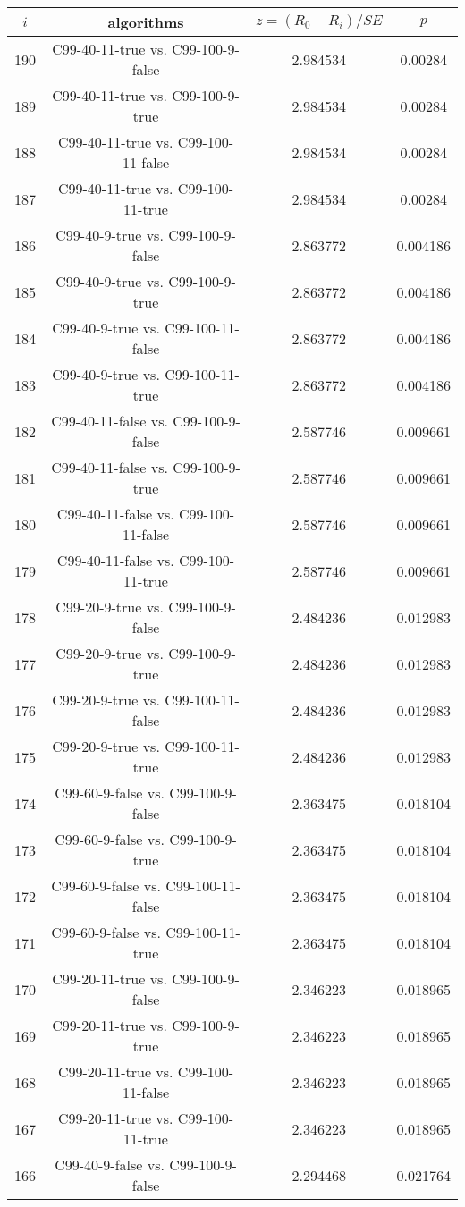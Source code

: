 \documentclass[a4paper,10pt]{article}
\begin{document}
\begin{landscape}
\begin{table}[!htp]
\centering\scriptsize
\begin{tabular}{cccc}
$i$&algorithms&$z=(R_0 - R_i)/SE$&$p$\\
\hline190&C99-40-11-true vs. C99-100-9-false&2.984534&0.00284\\
189&C99-40-11-true vs. C99-100-9-true&2.984534&0.00284\\
188&C99-40-11-true vs. C99-100-11-false&2.984534&0.00284\\
187&C99-40-11-true vs. C99-100-11-true&2.984534&0.00284\\
186&C99-40-9-true vs. C99-100-9-false&2.863772&0.004186\\
185&C99-40-9-true vs. C99-100-9-true&2.863772&0.004186\\
184&C99-40-9-true vs. C99-100-11-false&2.863772&0.004186\\
183&C99-40-9-true vs. C99-100-11-true&2.863772&0.004186\\
182&C99-40-11-false vs. C99-100-9-false&2.587746&0.009661\\
181&C99-40-11-false vs. C99-100-9-true&2.587746&0.009661\\
180&C99-40-11-false vs. C99-100-11-false&2.587746&0.009661\\
179&C99-40-11-false vs. C99-100-11-true&2.587746&0.009661\\
178&C99-20-9-true vs. C99-100-9-false&2.484236&0.012983\\
177&C99-20-9-true vs. C99-100-9-true&2.484236&0.012983\\
176&C99-20-9-true vs. C99-100-11-false&2.484236&0.012983\\
175&C99-20-9-true vs. C99-100-11-true&2.484236&0.012983\\
174&C99-60-9-false vs. C99-100-9-false&2.363475&0.018104\\
173&C99-60-9-false vs. C99-100-9-true&2.363475&0.018104\\
172&C99-60-9-false vs. C99-100-11-false&2.363475&0.018104\\
171&C99-60-9-false vs. C99-100-11-true&2.363475&0.018104\\
170&C99-20-11-true vs. C99-100-9-false&2.346223&0.018965\\
169&C99-20-11-true vs. C99-100-9-true&2.346223&0.018965\\
168&C99-20-11-true vs. C99-100-11-false&2.346223&0.018965\\
167&C99-20-11-true vs. C99-100-11-true&2.346223&0.018965\\
166&C99-40-9-false vs. C99-100-9-false&2.294468&0.021764\\

\end{tabular}
\end{table}
\end{landscape}
\end{document}
